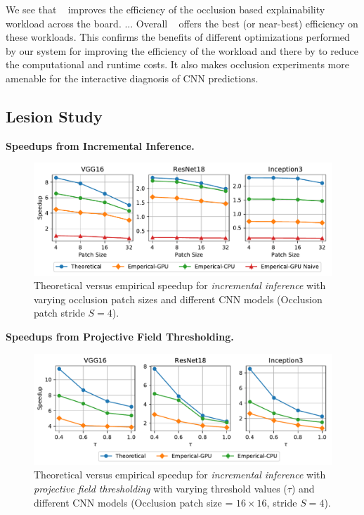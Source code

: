 We see that \system~ improves the efficiency of the occlusion based explainability workload across the board.
...
Overall \system~ offers the best (or near-best) efficiency on these workloads.
This confirms the benefits of different optimizations performed by our system for improving the efficiency of the workload and there by to reduce the computational and runtime costs.
It also makes occlusion experiments more amenable for the interactive diagnosis of CNN predictions.



\subsection{Lesion Study}

\vspace{2mm}
\noindent \textbf{Speedups from Incremental Inference.}
\begin{figure}[t]
\includegraphics[width=\columnwidth]{images/5_2_1_edited}
\caption{Theoretical versus empirical speedup for \textit{incremental inference} with varying occlusion patch sizes and different CNN models (Occlusion patch stride $S=4$).}
\label{fig:5_2_1_edited}
\end{figure}

\vspace{2mm}
\noindent \textbf{Speedups from Projective Field Thresholding.}
\begin{figure}[t]
\includegraphics[width=\columnwidth]{images/5_2_2_edited}
\caption{Theoretical versus empirical speedup for \textit{incremental inference} with \textit{projective field thresholding} with varying threshold values ($\tau$) and different CNN models (Occlusion patch size = $16 \times 16$, stride $S=4$).}
\label{fig:5_2_1_edited}
\end{figure}

